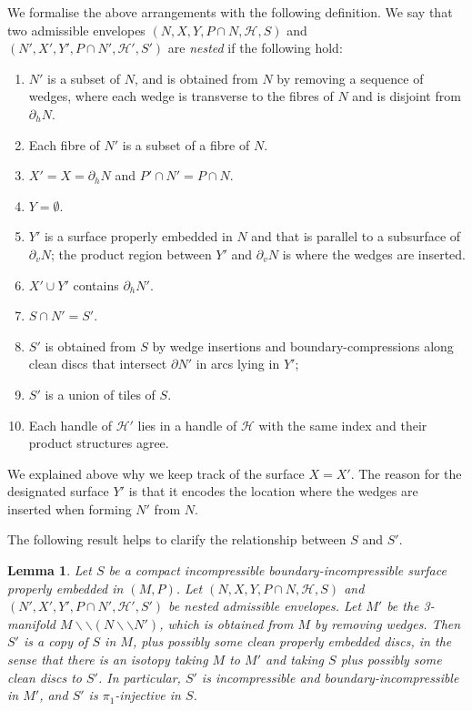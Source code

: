 \documentclass[oneside]{amsart}
\numberwithin{equation}{section}
\theoremstyle{plain}
\newtheorem{lemma}[equation]{Lemma}
\theoremstyle{definition}
\newcommand{\cut}{\backslash\backslash}
\begin{document}
We formalise the above arrangements with the following definition.
We say that two admissible envelopes $(N, X, Y, P \cap N, \mathcal{H}, S)$ and $(N', X', Y', P \cap N', \mathcal{H}', S')$ are \emph{nested} if
the following hold:
\begin{enumerate}
\item $N'$ is a subset of $N$, and is obtained from $N$ by removing a sequence of wedges, where
each wedge is transverse to the fibres of $N$ and is disjoint from $\partial_h N$.
\item Each fibre of $N'$ is a subset of a fibre of $N$.
\item $X' = X = \partial_h N$ and $P' \cap N'= P \cap N$.
\item $Y = \emptyset$.
\item $Y'$ is a surface properly embedded in $N$ and that is parallel to a subsurface of $\partial_v N$; the product region between $Y'$ and $\partial_v N$
is where the wedges are inserted.
\item $X' \cup Y'$ contains $\partial_h N'$.
\item $S \cap N' = S'$.
\item $S'$ is obtained from $S$ by wedge insertions and boundary-compressions along clean discs that intersect $\partial N'$ in arcs lying in $Y'$;
\item $S'$ is a union of tiles of $S$.
\item Each handle of $\mathcal{H}'$ lies in a handle of $\mathcal{H}$ with the same index and their product structures agree.
\end{enumerate}

We explained above why we keep track of the surface $X = X'$. The reason for the designated surface $Y'$ is that  it encodes
the location where the wedges are inserted when forming $N'$ from $N$.

The following result helps to clarify the relationship between $S$ and $S'$.

\begin{lemma}
Let $S$ be a compact incompressible boundary-incompressible surface properly embedded in $(M,P)$. Let $(N, X, Y, P \cap N, \mathcal{H}, S)$ and $(N', X', Y', P \cap N', \mathcal{H}', S')$
be nested admissible envelopes. Let $M'$ be the 3-manifold $M \cut (N \cut N')$, which is obtained from $M$ by removing wedges.
Then $S'$ is a copy of $S$ in $M$, plus possibly some clean properly embedded discs, in the sense that there is an isotopy
taking $M$ to $M'$ and taking $S$ plus possibly some clean discs to $S'$. In particular, $S'$ is
incompressible and boundary-incompressible in $M'$, and $S'$ is $\pi_1$-injective in $S$.
\end{lemma}
\end{document}

